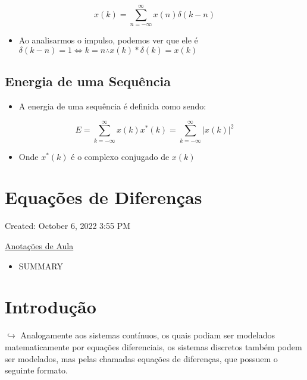 \documentclass{article}
\begin{document}
\begin{itemize}
\[
x(k) = \sum^{\infty}_{n = -\infty} x(n) \delta(k-n)
\]

\begin{itemize}
\tightlist
\item
  Ao analisarmos o impulso, podemos ver que ele é
  \(\delta (k - n) = 1 \iff k = n \therefore x(k)*\delta(k) = x(k)\)
\end{itemize}

\hypertarget{energia-de-uma-sequuxeancia}{%
\subsection{Energia de uma
Sequência}\label{energia-de-uma-sequuxeancia}}

\begin{itemize}
\tightlist
\item
  A energia de uma sequência é definida como sendo:
\end{itemize}

\[
E = \sum^{\infty}_{k=-\infty} x(k)x^* (k) = \sum^{\infty}_{k=-\infty} |x(k)|^2
\]

\begin{itemize}
\tightlist
\item
  Onde \(x^*(k)\) é o complexo conjugado de \(x(k)\)
\end{itemize}

\hypertarget{equauxe7uxf5es-de-diferenuxe7as}{%
\section{Equações de Diferenças}\label{equauxe7uxf5es-de-diferenuxe7as}}

Created: October 6, 2022 3:55 PM

\href{Equac\%CC\%A7o\%CC\%83es\%20de\%20Diferenc\%CC\%A7as\%20dade9854b424474788d76d451ec8302f/Anotac\%CC\%A7o\%CC\%83es\%20de\%20Aula\%20ce10f190576744fca8e314d3558b930f.md}{Anotações
de Aula}

\begin{itemize}
\tightlist
\item
  SUMMARY
\end{itemize}

\hypertarget{introduuxe7uxe3o-5}{%
\section{Introdução}\label{introduuxe7uxe3o-5}}

\(\hookrightarrow\) Analogamente aos sistemas contínuos, os quais podiam
ser modelados matematicamente por equações diferenciais, os sistemas
discretos também podem ser modelados, mas pelas chamadas equações de
diferenças, que possuem o seguinte formato.


\end{itemize}
\end{document}
